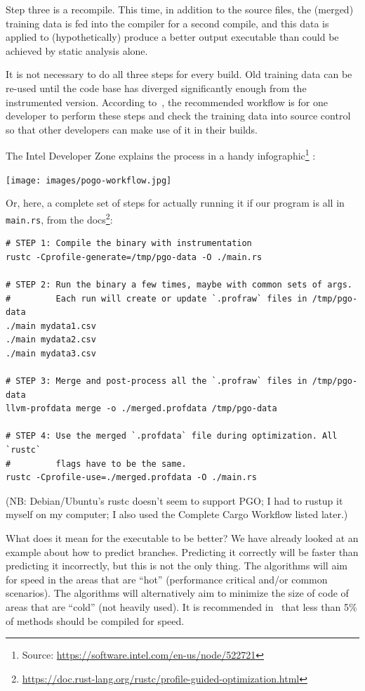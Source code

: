\documentclass[a4paper]{report}
\begin{document}
Step three is a recompile. This time, in addition to the source files, the (merged) training data is fed into the compiler for a second compile, and this data is applied to (hypothetically) produce a better output executable than could be achieved by static analysis alone.


It is not necessary to do all three steps for every build. Old training data can be re-used until the code base has diverged significantly enough from the instrumented version. According to~\cite{pogo}, the recommended workflow is for one developer to perform these steps and check the training data into source control so that other developers can make use of it in their builds.

The Intel Developer Zone explains the process in a handy infographic\footnote{Source: \url{https://software.intel.com/en-us/node/522721}} :

\begin{center}
	\texttt{[image: images/pogo-workflow.jpg]}
\end{center}



Or, here, a complete set of steps for actually running it if our program is all in \texttt{main.rs}, from the docs\footnote{\url{https://doc.rust-lang.org/rustc/profile-guided-optimization.html}}:

{\scriptsize
\begin{verbatim}
# STEP 1: Compile the binary with instrumentation
rustc -Cprofile-generate=/tmp/pgo-data -O ./main.rs

# STEP 2: Run the binary a few times, maybe with common sets of args.
#         Each run will create or update `.profraw` files in /tmp/pgo-data
./main mydata1.csv
./main mydata2.csv
./main mydata3.csv

# STEP 3: Merge and post-process all the `.profraw` files in /tmp/pgo-data
llvm-profdata merge -o ./merged.profdata /tmp/pgo-data

# STEP 4: Use the merged `.profdata` file during optimization. All `rustc`
#         flags have to be the same.
rustc -Cprofile-use=./merged.profdata -O ./main.rs
\end{verbatim}
}
(NB: Debian/Ubuntu's rustc doesn't seem to support PGO; I had to rustup it myself on my computer; I also used the Complete Cargo Workflow listed later.)

What does it mean for the executable to be better? We have already looked at an example about how to predict branches. Predicting it correctly will be faster than predicting it incorrectly, but this is not the only thing.  The algorithms will aim for speed in the areas that are ``hot'' (performance critical and/or common scenarios). The algorithms will alternatively aim to minimize the size of code of areas that are ``cold'' (not heavily used). It is recommended in~\cite{pogo} that less than 5\% of methods should be compiled for speed.
\end{document}
